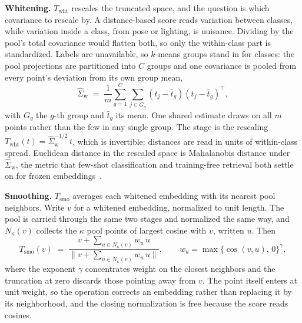 \textbf{Whitening.} $T_{\mathrm{wht}}$ rescales the truncated space, and
the question is which covariance to rescale by. A distance-based score
reads variation between classes, while variation inside a class, from
pose or lighting, is nuisance. Dividing by the pool's total covariance
would flatten both, so only the within-class part is standardized.
Labels are unavailable, so $k$-means groups stand in for classes: the
pool projections are partitioned into $C$ groups and one covariance is
pooled from every point's deviation from its own group mean,
\begin{equation}
\label{eq:sigmaw}
\widehat\Sigma_{\mathrm{w}} \;=\; \frac{1}{m} \sum_{g=1}^{C}
\sum_{j \in G_g} (t_j - \bar t_g)(t_j - \bar t_g)^{\top} ,
\end{equation}
with $G_g$ the $g$-th group and $\bar t_g$ its mean. One shared estimate
draws on all $m$ points rather than the few in any single group. The
stage is the rescaling
$T_{\mathrm{wht}}(t) = \widehat\Sigma_{\mathrm{w}}^{-1/2}\, t$, which is
invertible: distances are read in units of within-class spread.
Euclidean distance in the rescaled space is Mahalanobis distance under
$\widehat\Sigma_{\mathrm{w}}$, the metric that few-shot classification
and training-free retrieval both settle on for frozen
embeddings~\citep{bateni2020improved, min2026street}.

\textbf{Smoothing.} $T_{\mathrm{smo}}$ averages each whitened
embedding with its nearest pool neighbors. Write $v$ for a whitened embedding, normalized to unit length. The pool is carried through the same two stages and normalized the same way, and $N_{\kappa}(v)$ collects the $\kappa$ pool points of largest cosine with $v$, written $u$. Then
\begin{equation}
\label{eq:qe}
T_{\mathrm{smo}}(v) \;=\;
\frac{v + \sum_{u \in N_{\kappa}(v)} w_u\, u}
     {\bigl\| v + \sum_{u \in N_{\kappa}(v)} w_u\, u \bigr\|},
\qquad
w_u = \max\{\cos(v, u),\, 0\}^{\gamma} ,
\end{equation}
where the exponent $\gamma$ concentrates weight on the closest
neighbors and the truncation at zero discards those pointing away from
$v$. The point itself enters at unit weight, so the operation corrects
an embedding rather than replacing it by its neighborhood, and the
closing normalization is free because the score reads cosines.

